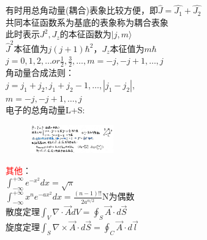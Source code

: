 \documentclass[a4paper,8pt]{extarticle} %
\newcommand{\redtext}[1]{\textcolor{red}{#1}}
\begin{document}
\begin{multicols}{3}
有时用总角动量(耦合)表象比较方便，即$\hat{J} = \hat{J_1}+\hat{J_2}$\\
共同本征函数系为基底的表象称为耦合表象\\
此时表示$J^2,J_z$的本征函数为$|j,m\rangle$\\
$\hat{J}^2$本征值为$j(j+1)\hbar^2$，$J_z$本征值为$m\hbar$\\
$j=0,1,2,\dots or \frac{1}{2},\frac{3}{2},\dots, m=-j,-j+1,\dots,j$\\
角动量合成法则：\\$j=j_1+j_2,j_1+j_2-1,\dots,|j_1-j_2|$,
\\$m=-j,-j+1,\dots,j$\\
电子的总角动量L+S:\\
\begin{figure}[H]
    \vspace{-0.5cm}
    \centering
    \includegraphics[width=0.32\textwidth]{images/12.png}
    \vspace{-0.6cm}
\end{figure}

\redtext{其他}：\\
$\int_{-\infty}^{+\infty}e^{-x^2}dx = \sqrt{\pi}$\\
$\int_{-\infty}^{+\infty}x^ne^{-ax^2}dx = \frac{(n-1)!!}{2a^{n/2}}$N为偶数\\
散度定理$\int_V \nabla\cdot\vec{A}dV = \oint_S \vec{A}\cdot d\vec{S}$\\
旋度定理$\int_S \nabla\times\vec{A}\cdot d\vec{S} = \oint_C \vec{A}\cdot d\vec{l}$\\
\end{multicols}
\end{document}
